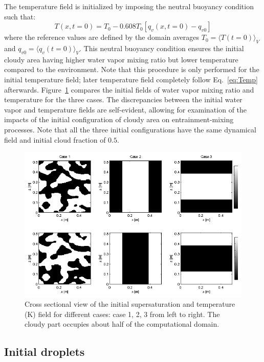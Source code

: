 \documentclass[draft,jgrga]{AGUTeX}
\newcommand{\Eq}[1]{Eq.~\eqref{#1}} \newcommand{\Fig}[1]{Figure~\ref{#1}}
\begin{document}
\begin{article}
The temperature field is initialized by imposing the neutral buoyancy condition \cite{Kumar14} such that:
\begin{equation}
T(x,t = 0) = T_0 - 0.608T_0[q_v(x,t = 0) - q_{v0}]
\end{equation}
where the reference values are defined by the domain averages $T_0 = \langle T(t=0)\rangle_V$ and $q_{v0} = \langle q_v(t=0)\rangle_V$. This neutral buoyancy condition ensures the initial cloudy area having higher water vapor mixing ratio but lower temperature compared to the environment. Note that this procedure is only performed for the initial temperature field; later temperature field completely follow \Eq{eq:Temp} afterwards. \Fig{fig:slice_case123} compares the initial fields of water vapor 
mixing ratio and temperature for the three cases. The discrepancies between the initial water vapor 
and temperature fields are self-evident, allowing for examination of the impacts of the initial 
configuration of cloudy area on entrainment-mixing processes. Note that all the three initial 
configurations have the same dynamical field and initial cloud fraction of $0.5$.

\begin{figure}\centering
\includegraphics[width=0.9\linewidth]{Figures/init_vapor_supersat}
\caption{Cross sectional view of the initial supersaturation and temperature (K) field for different cases: case 1, 2, 3 from left to right. The cloudy part occupies about half of the computational domain.\label{fig:slice_case123}}
\end{figure}

\subsection{Initial droplets}


\end{article}
\end{document}
